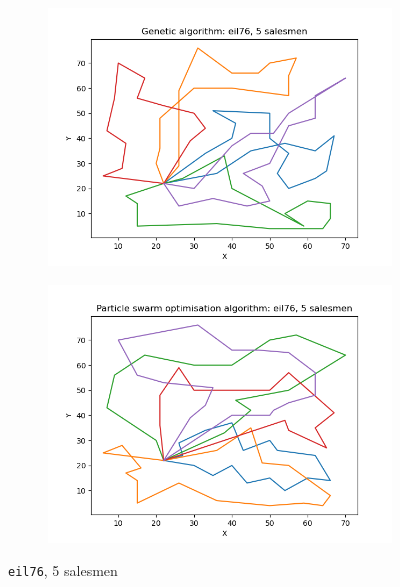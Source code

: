 \documentclass[conference]{IEEEtran}
\begin{document}
\begin{figure}[h]
    \centering
    \begin{subfigure}{.5\textwidth}
      \centering
      \includegraphics[width=\textwidth]{images/Genetic algorithm: eil76, 5 salesmen.png}
    \end{subfigure}%
    \begin{subfigure}{.5\textwidth}
      \centering
      \includegraphics[width=\textwidth]{images/Particle swarm optimisation algorithm: eil76, 5 salesmen.png}
    \end{subfigure}%
    \caption{\texttt{eil76}, 5 salesmen} \label{eil76, 5 salesmen}
\end{figure}
\end{document}
